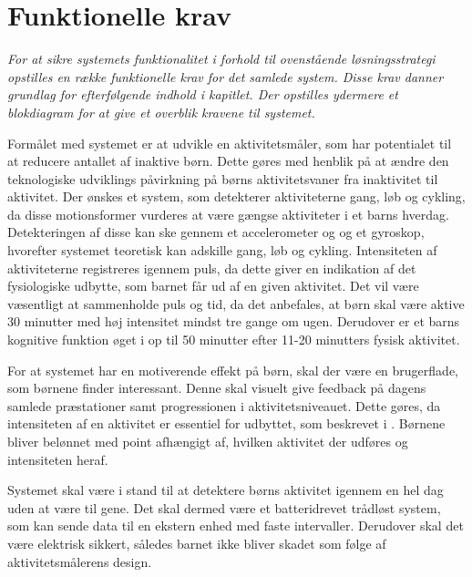 \section{Funktionelle krav}\label{funktionellekrav}
\textit{For at sikre systemets funktionalitet i forhold til ovenstående løsningsstrategi opstilles en række funktionelle krav for det samlede system. Disse krav danner grundlag for efterfølgende indhold i kapitlet. Der opstilles ydermere et blokdiagram for at give et overblik kravene til systemet.}

Formålet med systemet er at udvikle en aktivitetsmåler, som har potentialet til at reducere antallet af inaktive børn. Dette gøres med henblik på at ændre den teknologiske udviklings påvirkning på børns aktivitetsvaner fra inaktivitet til aktivitet. Der ønskes et system, som detekterer aktiviteterne gang, løb og cykling, da disse motionsformer vurderes at være gængse aktiviteter i et barns hverdag. Detekteringen af disse kan ske gennem et accelerometer og og et gyroskop, hvorefter systemet teoretisk kan adskille gang, løb og cykling. Intensiteten af aktiviteterne registreres igennem puls, da dette giver en indikation af det fysiologiske udbytte, som barnet får ud af en given aktivitet. Det vil være væsentligt at sammenholde puls og tid, da det anbefales, at børn skal være aktive 30 minutter med høj intensitet mindst tre gange om ugen. Derudover er et barns kognitive funktion øget i op til 50 minutter efter 11-20 minutters fysisk aktivitet.

For at systemet har en motiverende effekt på børn, skal der være en brugerflade, som børnene finder interessant. Denne skal visuelt give feedback på dagens samlede præstationer samt progressionen i aktivitetsniveauet. Dette gøres, da intensiteten af en aktivitet er essentiel for udbyttet, som beskrevet i . %
Børnene bliver belønnet med point afhængigt af, hvilken aktivitet der udføres og intensiteten heraf.  

Systemet skal være i stand til at detektere børns aktivitet igennem en hel dag uden at være til gene. %
Det skal dermed være et batteridrevet trådløst system, som kan sende data til en ekstern enhed med faste intervaller. Derudover skal det være elektrisk sikkert, således barnet ikke bliver skadet som følge af aktivitetsmålerens design. 

